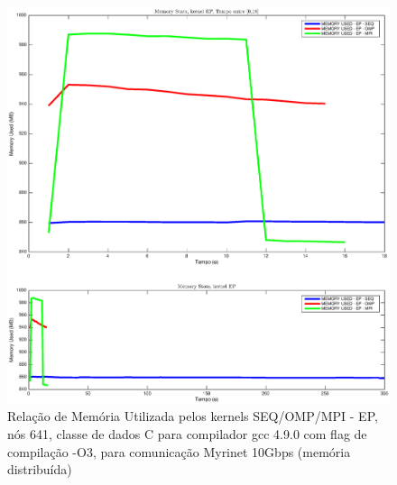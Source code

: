 \documentclass[conference,compsoc]{IEEEtran}
\begin{document}
\begin{figure}[H]
\centering
\includegraphics[width=1.1\columnwidth]{EPS/dstat_EP_seq_vs_omp_vs_mpi/memory.eps}
\caption{Relação de Memória Utilizada pelos kernels SEQ/OMP/MPI - EP, nós 641, classe de dados C para compilador gcc 4.9.0 com flag de compilação  -O3, para comunicação Myrinet 10Gbps (memória distribuída)}
\label{dstat_ep_SOM_mem}
\end{figure}
\end{document}
